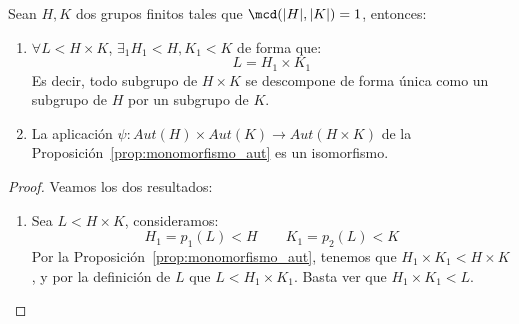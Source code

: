 \begin{teo}\label{teo:grupos_finitos_producto}
    Sean $H,K$ dos grupos finitos tales que $\mcd(|H|,|K|) = 1$, entonces: 
    \begin{enumerate}
        \item $\forall L<H\times K$, $\exists_1 H_1<H, K_1<K$ de forma que:
            \begin{equation*}
                L = H_1\times K_1
            \end{equation*}
            Es decir, todo subgrupo de $H\times K$ se descompone de forma única como un subgrupo de $H$ por un subgrupo de $K$.
        \item La aplicación $\psi:Aut(H)\times Aut(K)\to Aut(H\times K)$ de la Proposición~\ref{prop:monomorfismo_aut} es un isomorfismo.
    \end{enumerate}
    \begin{proof}
        Veamos los dos resultados:
        \begin{enumerate}
            \item Sea $L<H\times K$, consideramos:
                \begin{equation*}
                    H_1 = p_1(L) < H \qquad K_1 = p_2(L) < K
                \end{equation*}
                Por la Proposición~\ref{prop:monomorfismo_aut}, tenemos que $H_1\times K_1 < H\times K$, y por la definición de $L$ que $L < H_1\times K_1$. Basta ver que $H_1\times K_1 < L$.


\end{enumerate}
\end{proof}
\end{teo}
